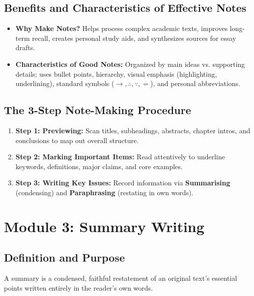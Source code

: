 \documentclass[11pt, a4paper]{article}
\begin{document}
\subsection{Benefits and Characteristics of Effective Notes}
\begin{itemize}
    \item \textbf{Why Make Notes?} Helps process complex academic texts, improves long-term recall, creates personal study aids, and synthesizes sources for essay drafts.
    \item \textbf{Characteristics of Good Notes:} Organized by main ideas vs. supporting details; uses bullet points, hierarchy, visual emphasis (highlighting, underlining), standard symbols ($\rightarrow, \therefore, \because, =$), and personal abbreviations.
\end{itemize}

\subsection{The 3-Step Note-Making Procedure}
\begin{enumerate}
    \item \textbf{Step 1: Previewing:} Scan titles, subheadings, abstracts, chapter intros, and conclusions to map out overall structure.
    \item \textbf{Step 2: Marking Important Items:} Read attentively to underline keywords, definitions, major claims, and core examples.
    \item \textbf{Step 3: Writing Key Issues:} Record information via \textbf{Summarising} (condensing) and \textbf{Paraphrasing} (restating in own words).
\end{enumerate}

\newpage

\section{Module 3: Summary Writing}

\subsection{Definition and Purpose}
A summary is a condensed, faithful restatement of an original text's essential points written entirely in the reader's own words.
\end{document}
